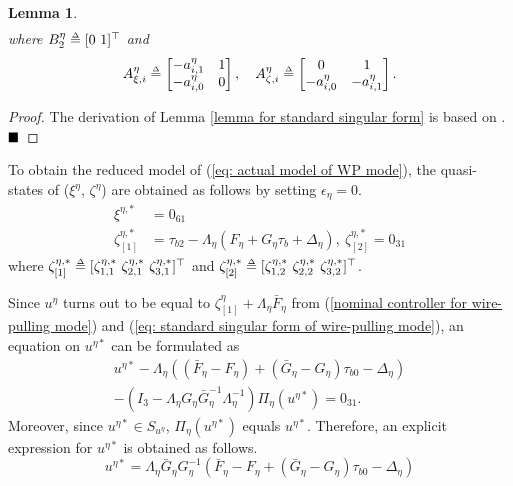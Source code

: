 \documentclass[letterpaper, 10 pt, conference]{ieeeconf}  %
\def\delequal{\mathrel{\ensurestackMath{\stackon[1pt]{=}{\scriptscriptstyle\Delta}}}}
\newtheorem{lemma}{Lemma}
\theoremstyle{definition}
\begin{document}
\begin{lemma}
\begin{equation}
\begin{split}
    \end{split}
\end{equation}
where $B^{\eta}_2 \delequal [0 \ 1]^{\top}$ and
\begin{equation*}
    A^{\eta}_{\xi, i} \delequal
    \begin{bmatrix}
        -a^{\eta}_{i, 1} & 1 \\
        -a^{\eta}_{i, 0} & 0
    \end{bmatrix}, \quad A^{\eta}_{\zeta, i} \delequal
    \begin{bmatrix}
         0 & 1 \\
        -a^{\eta}_{i, 0} & -a^{\eta}_{i, 1}
    \end{bmatrix}.
\end{equation*}
\end{lemma}
\begin{proof}
The derivation of Lemma \ref{lemma for standard singular form} is based on \cite[Appendix A]{bang2009robust}. $\hfill \blacksquare$ 
\end{proof} 

To obtain the reduced model of (\ref{eq: actual model of WP mode}), the quasi-states of ($\xi^{\eta}$, $\zeta^{\eta}$) are obtained as follows by setting $\epsilon_{\eta} = 0$.
\begin{equation} \label{eq: quasi-states of xi and zeta}
    \begin{split}
        \xi^{\eta, *} &= 0_{6 1} \\  
        \zeta^{\eta, *}_{[1]} &= \tau_{b 2} - \Lambda_{\eta}(F_{\eta} + G_{\eta}\tau_b + \Delta_{\eta}), \ \zeta^{\eta, *}_{[2]} = 0_{3 1}
    \end{split}
\end{equation}
where $\zeta^{\eta, *}_{[1]} \delequal [\zeta^{\eta, *}_{1, 1} \ \zeta^{\eta, *}_{2, 1} \ \zeta^{\eta, *}_{3, 1}]^{\top}$ and $\zeta^{\eta, *}_{[2]} \delequal [\zeta^{\eta, *}_{1, 2} \ \zeta^{\eta, *}_{2, 2} \ \zeta^{\eta, *}_{3, 2}]^{\top}$.

Since $u^{\eta}$ turns out to be equal to $\zeta^{\eta}_{[1]} + \Lambda_{\eta} \bar{F}_{\eta}$ from (\ref{nominal controller for wire-pulling mode}) and (\ref{eq: standard singular form of wire-pulling mode}), an equation on $u^{\eta *}$ can be formulated as
\begin{multline} \label{eq: equation for ustar}
    u^{\eta *} - \Lambda_{\eta}((\bar{F}_{\eta} - F_{\eta}) + (\bar{G}_{\eta} - G_{\eta})\tau_{b 0} - \Delta_{\eta}) \\- (I_{3} - \Lambda_{\eta}G_{\eta}\bar{G}_{\eta}^{-1}\Lambda_{\eta}^{-1})\Pi_{\eta}(u^{\eta *}) = 0_{3 1}.
\end{multline}
Moreover, since $u^{\eta *} \in S_{u^\eta}$, $\Pi_{\eta}(u^{\eta *})$ equals $u^{\eta *}$. Therefore, an explicit expression for $u^{\eta *}$ is obtained as follows.
\begin{equation} \label{eq: solution for ustar}
    u^{\eta *} = \Lambda_{\eta} \bar{G}_{\eta}G_{\eta}^{-1}(\bar{F}_{\eta} - F_{\eta} + (\bar{G}_{\eta} - G_{\eta})\tau_{b 0} - \Delta_{\eta})
\end{equation}
\end{document}

